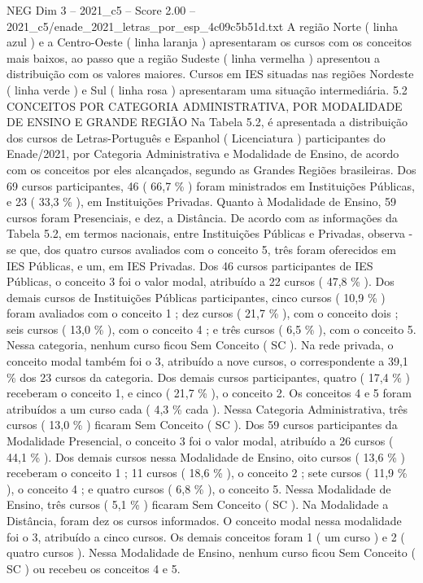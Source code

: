 \begin{textsample}{NEG Dim 3 – 2021\_c5 – Score 2.00 – 2021\_c5/enade\_2021\_letras\_por\_esp\_4c09c5b51d.txt}
A região Norte ( linha azul ) e a Centro-Oeste ( linha laranja ) apresentaram os cursos com os conceitos mais baixos, ao passo que a região Sudeste ( linha vermelha ) apresentou a distribuição com os valores maiores.
Cursos em IES situadas nas regiões Nordeste ( linha verde ) e Sul ( linha rosa ) apresentaram uma situação intermediária. 5.2 CONCEITOS POR CATEGORIA ADMINISTRATIVA, POR MODALIDADE DE ENSINO E GRANDE REGIÃO Na Tabela 5.2, é apresentada a distribuição dos cursos de Letras-Português e Espanhol ( Licenciatura ) participantes do Enade/2021, por Categoria Administrativa e Modalidade de Ensino, de acordo com os conceitos por eles alcançados, segundo as Grandes Regiões brasileiras.
Dos 69 cursos participantes, 46 ( 66,7 \% ) foram ministrados em Instituições Públicas, e 23 ( 33,3 \% ), em Instituições Privadas.
Quanto à Modalidade de Ensino, 59 cursos foram Presenciais, e dez, a Distância.
De acordo com as informações da Tabela 5.2, em termos nacionais, entre Instituições Públicas e Privadas, observa -se que, dos quatro cursos avaliados com o conceito 5, três foram oferecidos em IES Públicas, e um, em IES Privadas.
Dos 46 cursos participantes de IES Públicas, o conceito 3 foi o valor modal, atribuído a 22 cursos ( 47,8 \% ).
Dos demais cursos de Instituições Públicas participantes, cinco cursos ( 10,9 \% ) foram avaliados com o conceito 1 ; dez cursos ( 21,7 \% ), com o conceito dois ; seis cursos ( 13,0 \% ), com o conceito 4 ; e três cursos ( 6,5 \% ), com o conceito 5.
Nessa categoria, nenhum curso ficou Sem Conceito ( SC ).
Na rede privada, o conceito modal também foi o 3, atribuído a nove cursos, o correspondente a 39,1 \% dos 23 cursos da categoria.
Dos demais cursos participantes, quatro ( 17,4 \% ) receberam o conceito 1, e cinco ( 21,7 \% ), o conceito 2.
Os conceitos 4 e 5 foram atribuídos a um curso cada ( 4,3 \% cada ).
Nessa Categoria Administrativa, três cursos ( 13,0 \% ) ficaram Sem Conceito ( SC ).
Dos 59 cursos participantes da Modalidade Presencial, o conceito 3 foi o valor modal, atribuído a 26 cursos ( 44,1 \% ).
Dos demais cursos nessa Modalidade de Ensino, oito cursos ( 13,6 \% ) receberam o conceito 1 ; 11 cursos ( 18,6 \% ), o conceito 2 ; sete cursos ( 11,9 \% ), o conceito 4 ; e quatro cursos ( 6,8 \% ), o conceito 5.
Nessa Modalidade de Ensino, três cursos ( 5,1 \% ) ficaram Sem Conceito ( SC ).
Na Modalidade a Distância, foram dez os cursos informados.
O conceito modal nessa modalidade foi o 3, atribuído a cinco cursos.
Os demais conceitos foram 1 ( um curso ) e 2 ( quatro cursos ).
Nessa Modalidade de Ensino, nenhum curso ficou Sem Conceito ( SC ) ou recebeu os conceitos 4 e 5.

\end{textsample}
